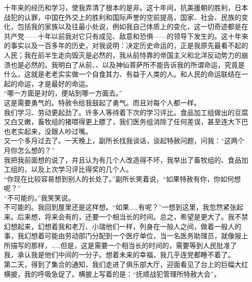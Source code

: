 十年来的经历和学习，使我弄清了根本的是非。这十年间，抗美援朝的胜利，日本战犯的认罪，中国在外交上的胜利和国际声誉的空前提高，国家、社会、民族的变化，包括我的家族以及往最小处说，例如我自己体质上的变化，这一切奇迹都是在共产党——十年以前我对它只有成见、敌意和恐惧——的领导下发生的。这十年来的事实以及一百多年的历史，对我说明：决定历史命运的，正是我原先最看不起的人民；我在前半生走向毁灭是必然的，我从前恃靠的帝国主义和北洋反动势力的崩溃也是必然的。我明白了从前、、以及神仙菩萨所不能告诉我的所谓命运，究竟是什么，这就是老老实实做一个自食其力、有益于人类的人。和人民的命运联结在一起的命运，才是最好的命运。\\

“哪一方面是对的，便站到哪一方面去。”\\

这是需要勇气的。特赦令给我鼓起了勇气。而且对每个人都一样。\\

我们学习、劳动更起劲了。许多人等待着下次的学习评比。食品加工组做出的豆腐又白又嫩，畜牧组的猪喂得更上膘了，我们医务组消除了任何差误，甚至连大下巴也老实起来，没跟人吵过嘴。\\

又一个多月过去了。一天晚上，副所长找我谈话，谈起特赦问题，问我：“这两个月你怎么想的？”\\

我把我前面想的说了，并且认为有几个人改造得不坏，我举出了畜牧组的、食品加工组的，以及上次学习评比得奖的几个人。\\

“你现在比较容易想到别人的长处了。”副所长笑着说，“如果特赦有你，你如何想呢？”\\

“不可能的。”我笑笑说。\\

不可能的。我回到屋里还是这样想。“如果……有呢？”一想到这里，我忽然紧张起来。后来想，将来会有的，还要一个相当长的时间。总之，希望是更大了。我不禁幻想起来，幻想着我和老万、小瑞他们一样，列身在一般人之间，做着一般人的事，我幻想着可能由劳动部门分配到一个医疗单位，当一名医务助理员，就像报上所描写的那样，……但是，这是需要一个相当长的时间的，需要等到人民批准了我，承认我是他们中间的一分子。想着未来的幸福，我几乎连党都睡不着了。\\

第二天，得到了集合的通知，我们走进了俱乐部大厅，迎面看见了台上的巨幅大红横披，我的呼吸急促了。横披上写着的是：“抚顺战犯管理所特赦大会”。\\

